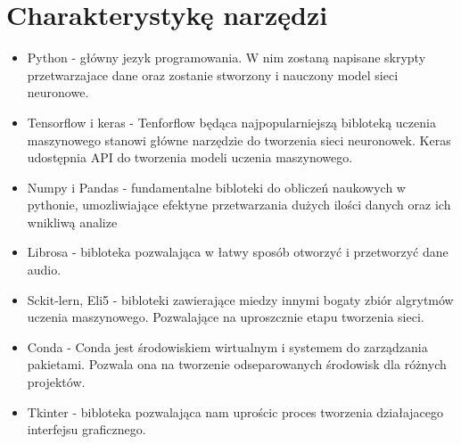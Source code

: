 \documentclass[12pt,titlepage]{article}
\begin{document}
\section{Charakterystykę narzędzi}
\begin{itemize}
    \item Python - główny jezyk programowania. W nim zostaną napisane skrypty przetwarzajace dane oraz zostanie stworzony i nauczony model sieci neuronowe.
    \item Tensorflow i keras - Tenforflow będąca najpopularniejszą bibloteką uczenia maszynowego stanowi główne narzędzie do tworzenia sieci neuronowek. Keras udostępnia API do tworzenia modeli uczenia maszynowego.
    \item Numpy i Pandas - fundamentalne bibloteki do obliczeń naukowych w pythonie, umozliwiające efektyne przetwarzania dużych ilości danych oraz ich wnikliwą analize
    \item Librosa - bibloteka pozwalająca w łatwy sposób otworzyć i przetworzyć dane audio.
    \item Sckit-lern, Eli5 - bibloteki zawierające miedzy innymi bogaty zbiór algrytmów uczenia maszynowego. Pozwalające na uproszcznie etapu tworzenia sieci.
    \item Conda - Conda jest środowiskiem wirtualnym i systemem do zarządzania pakietami. Pozwala ona na tworzenie odseparowanych środowisk dla różnych projektów.
    \item Tkinter - bibloteka pozwalająca nam uprościc proces tworzenia działajacego interfejsu graficznego.
\end{itemize}
\end{document}
